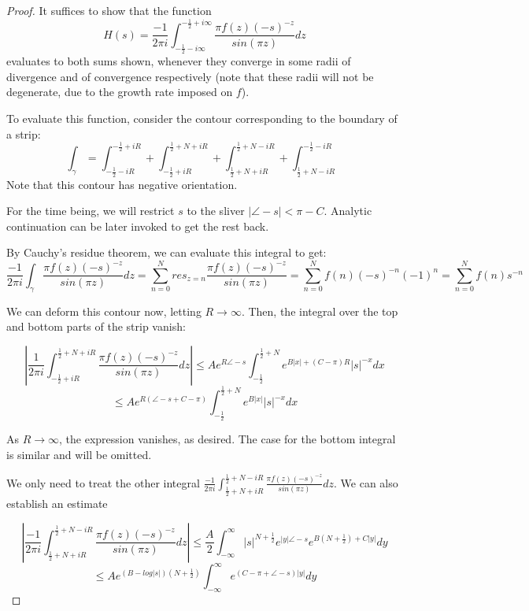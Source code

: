\documentclass{article}
\begin{document}
	\begin{proof}
		It suffices to show that the function $$ H(s) = \frac{-1}{2 \pi i} \int_{-\frac{1}{2} - i \infty}^{-\frac{1}{2} + i \infty} \frac{\pi f(z) (-s)^{-z}}{ sin( \pi z ) } dz $$ evaluates to both sums shown, whenever they converge in some radii of divergence and of convergence respectively (note that these radii will not be degenerate, due to the growth rate imposed on $f$). 
		
		To evaluate this function, consider the contour corresponding to the boundary of a strip:
		$$ \int_{ \gamma } = \int_{-\frac{1}{2} - i R}^{-\frac{1}{2} + i R} + \int_{-\frac{1}{2} + i R}^{ \frac{1}{2} + N + i R } + \int_{ \frac{1}{2} + N + i R}^{ \frac{1}{2} + N - i R} + \int_{ \frac{1}{2} + N - i R }^{-\frac{1}{2} - i R} $$
		Note that this contour has negative orientation. 
		
		For the time being, we will restrict $s$ to the sliver $ \left| \angle -s \right| < \pi - C $. Analytic continuation can be later invoked to get the rest back. 
		
		By Cauchy's residue theorem, we can evaluate this integral to get:
		$$ \frac{-1}{2 \pi i} \int_{ \gamma } \frac{\pi f(z) (-s)^{-z}}{ sin( \pi z ) } dz = \sum_{n=0}^{N} res_{z=n} \frac{\pi f(z) (-s)^{-z}}{ sin( \pi z ) } =  \sum_{n=0}^{N} f(n) (-s)^{-n} (-1)^{n} = \sum_{n=0}^{N} f(n) s^{-n} $$
		
		We can deform this contour now, letting $R \rightarrow \infty$. Then, the integral over the top and bottom parts of the strip vanish:
		
		$$ \left| \frac{1}{2 \pi i} \int_{-\frac{1}{2} + i R}^{ \frac{1}{2} + N + i R }  \frac{\pi f(z) (-s)^{-z}}{ sin( \pi z ) } dz \right| 
		\leq A e^{R \angle -s} \int_{-\frac{1}{2} }^{ \frac{1}{2} + N } e^{ B \left| x \right| + ( C - \pi ) R } \left| s \right|^{-x} dx $$
		$$ \leq A e^{R \left( \angle -s + C - \pi \right)} \int_{-\frac{1}{2} }^{ \frac{1}{2} + N } e^{ B \left| x \right| } \left| s \right|^{-x} dx $$
		
		As $R \rightarrow \infty$, the expression vanishes, as desired. The case for the bottom integral is similar and will be omitted. 
		
		We only need to treat the other integral $ \frac{-1}{2 \pi i} \int_{ \frac{1}{2} + N + i R}^{ \frac{1}{2} + N - i R} \frac{\pi f(z) (-s)^{-z}}{ sin( \pi z ) } dz $. 
		We can also establish an estimate
		
		$$ \left|\frac{-1}{2 \pi i} \int_{ \frac{1}{2} + N + i R}^{ \frac{1}{2} + N - i R} \frac{\pi f(z) (-s)^{-z}}{ sin( \pi z ) } dz \right| \leq \frac{A}{2} \int_{-\infty}^{\infty} \left| s \right|^{N+\frac{1}{2}} e^{ \left| y \right| \angle -s} e^{ B (N + \frac{1}{2}) + C \left| y \right| }  dy $$
		$$ \leq A e^{ ( B - log \left| s \right| ) (N + \frac{1}{2}) } \int_{-\infty}^{\infty} e^{ ( C - \pi + \angle -s ) \left| y \right|} dy $$
		

\end{proof}
\end{document}
